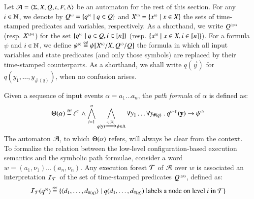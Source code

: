 \documentclass{llncs}
\begin{document}
Let $\mathcal{A} = \langle \Sigma,X,Q,\iota,F,\Delta \rangle$ be an automaton for the
rest of this section. For any $i \in {\bf \mathbb{N}}$, we denote by ${Q}^{\scriptscriptstyle{({i})}}
= \{ {q}^{\scriptscriptstyle{({i})}} \mid q \in Q \}$ and ${X}^{\scriptscriptstyle{({i})}} =
\{ {x}^{\scriptscriptstyle{({i})}} \mid x \in X \}$ the sets of time-stamped predicates
and variables, respectively. As a shorthand, we write ${Q}^{\scriptscriptstyle{({\leq
  n})}}$ (resp.  ${X}^{\scriptscriptstyle{({\leq n})}}$) for the set $\{ {q}^{\scriptscriptstyle{({i})}} \mid
  q \in Q, i \in [n] \}$ (resp. $\{ {x}^{\scriptscriptstyle{({i})}} \mid x \in X, i \in
  [n] \}$). For a formula $\psi$ and $i \in {\bf \mathbb{N}}$, we define
${\psi}^{\scriptscriptstyle{({i})}} \stackrel{\scriptscriptstyle{\mathsf{def}}}{=} \psi[{X}^{\scriptscriptstyle{({i})}}/X,{Q}^{\scriptscriptstyle{({i})}}/Q]$ the
formula in which all input variables and state predicates (and only
those symbols) are replaced by their time-stamped counterparts. As a
shorthand, we shall write $q(\vec{y})$ for $q(y_1,\ldots,y_{\#(q)})$,
when no confusion arises.

Given a sequence of input events $\alpha = a_1 \ldots a_n$, the
\emph{path formula} of $\alpha$ is defined as:
\begin{equation}\label{eq:pathform}
\Theta({\alpha}) \stackrel{\scriptscriptstyle{\mathsf{def}}}{=} {\iota}^{\scriptscriptstyle{({0})}} \wedge 
\bigwedge_{i=1}^n \bigwedge_{q(\mathbf y) \xrightarrow{{\scriptscriptstyle a_i(X)}}_{{\scriptstyle }}
  \psi \in \Delta} \forall y_1 \ldots \forall y_{\#(q)} ~.~
{q}^{\scriptscriptstyle{({i-1})}}(\mathbf y) \rightarrow {\psi}^{\scriptscriptstyle{({i})}}
\end{equation}
The automaton $\mathcal{A}$, to which $\Theta({\alpha})$ refers, will always
be clear from the context. To formalize the relation between the
low-level configuration-based execution semantics and the symbolic
path formulae, consider a word $w=(a_1,\nu_1) \ldots (a_n,\nu_n)$. Any
execution forest $\mathcal{T}$ of $\mathcal{A}$ over $w$ is associated an interpretation
$\mathcal{I}_{\mathcal{T}}$ of the set of time-stamped predicates ${Q}^{\scriptscriptstyle{({\leq n})}}$,
defined as:
\[\mathcal{I}_{\mathcal{T}}({q}^{\scriptscriptstyle{({i})}}) \stackrel{\scriptscriptstyle{\mathsf{def}}}{=} \{ \langle d_1,\ldots,d_{\#(q)} \rangle \mid
  q(d_1,\ldots,d_{\#(q)}) \text{ labels a node on level $i$ in $\mathcal{T}$} \}\]
\end{document}
